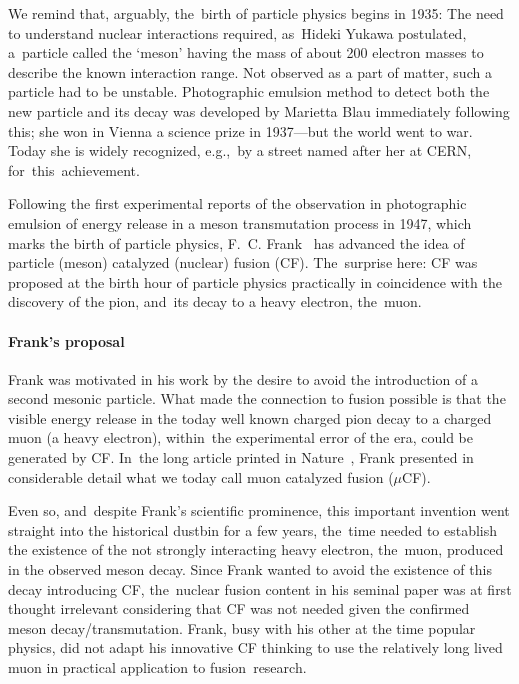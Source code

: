 \documentclass[particles,article,accept,pdftex,moreauthors]{Definitions/mdpi}
\begin{document}
We remind that, arguably, the~birth of particle physics begins in 1935: The need to understand nuclear interactions required, as~Hideki Yukawa postulated, a~particle called the `meson' having the mass of about 200 electron masses to describe the known interaction range. Not observed as a part of matter, such a particle had to be unstable. Photographic emulsion method to detect both the new particle and its decay was developed by Marietta Blau immediately following this; she won in Vienna a science prize in 1937---but the world went to war. Today she is widely recognized, e.g.,~by a street named after her at CERN, for~this~achievement.

Following the first experimental reports of the observation in photographic emulsion of energy release in a meson transmutation process in 1947, which marks the birth of particle physics, F.~C. Frank~\cite{Frank:1947} has advanced the idea of particle (meson) catalyzed (nuclear) fusion (CF). The~surprise here: CF was proposed at the birth hour of particle physics practically in coincidence with the discovery of the pion, and~its decay to a heavy electron, the~muon. 

\vspace{-6pt}\paragraph*{\bf Frank's proposal}
Frank was motivated in his work by the desire to avoid the introduction of a second mesonic particle. What made the connection to fusion possible is that the visible energy release in the today well known charged pion decay to a charged muon (a heavy electron), within~the experimental error of the era, could be generated by CF. In~the long article printed in Nature~\cite{Frank:1947}, Frank presented in considerable detail what we today call muon catalyzed fusion ($\mu$CF). 

Even so, and~despite Frank's scientific prominence, this important invention went straight into the historical dustbin for a few years, the~time needed to establish the existence of the not strongly interacting heavy electron, the~muon, produced in the observed meson decay. Since Frank wanted to avoid the existence of this decay introducing CF, the~nuclear fusion content in his seminal paper was at first thought irrelevant considering that CF was not needed given the confirmed meson decay/transmutation. Frank, busy with his other at the time popular physics, did not adapt his innovative CF thinking to use the relatively long lived muon in practical application to fusion~research.
\end{document}
